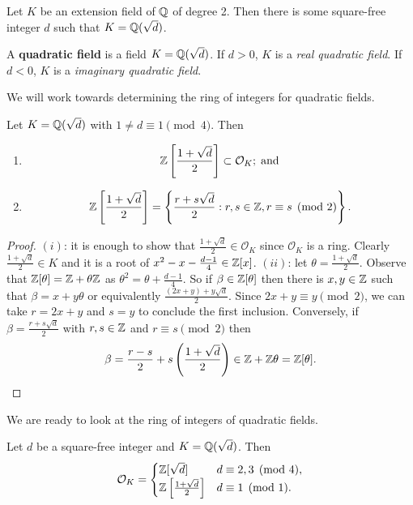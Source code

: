 \begin{proposition}[]
	Let $K$ be an extension field of $\mathbb{Q}$ of degree 2.
	Then there is some square-free integer $d$ such that $K = \mathbb{Q}(\sqrt d)$.
\end{proposition}

\begin{definition}
	A \textbf{quadratic field} is a field $K = \mathbb{Q}(\sqrt d)$.
	If $d > 0$, $K$ is a \emph{real quadratic field}.
	If $d < 0$, $K$ is a \emph{imaginary quadratic field}.
\end{definition}

We will work towards determining the ring of integers for quadratic fields.

\begin{lemma}[]
	Let $K = \mathbb{Q}(\sqrt d)$ with $1 \neq d \equiv 1 \pmod 4$.
	Then
	\begin{enumerate}
		\item
			\[
				\mathbb{Z} \left[ \frac{1+\sqrt d}2 \right] 
				\subset \mathcal O_K;\;\text{and}
			\]

		\item
			\[
				\mathbb{Z} \left[
					\frac{1 + \sqrt d}2
				\right] = \left\{
					\frac{r + s\sqrt d}2:
					r,s \in \mathbb{Z}, r \equiv s \pmod 2
				\right\}.
			\]
	\end{enumerate}
\end{lemma}

\begin{proof}
	$(i)$: it is enough to show that $\frac{1 + \sqrt d}2 \in \mathcal O_K$
	since $\mathcal O_K$ is a ring.
	Clearly $\frac{1 + \sqrt d}2 \in K$ and it is a root of
	$x^2 - x - \frac{d-1}4 \in \mathbb{Z}[x]$.
	$(ii)$: let $\theta = \frac{1 + \sqrt d}2$.
	Observe that $\mathbb{Z}[\theta] = \mathbb{Z} + \theta\mathbb{Z}$ as
	$\theta^2 = \theta + \frac{d-1}4$.
	So if $\beta \in \mathbb{Z}[\theta]$ then there is $x,y \in \mathbb{Z}$ such that
	$\beta = x + y\theta$ or equivalently
	$
		\frac{(2x+y)+y\sqrt d}{2}.
	$
	Since $2x + y \equiv y \pmod 2$, we can take $r = 2x + y$ and
	$s = y$ to conclude the first inclusion.
	Conversely, if $\beta = \frac{r+s\sqrt d}2$ with $r,s \in \mathbb{Z}$ and
	$r \equiv s \pmod 2$ then 
	\[
		\beta = \frac{r-s}2 + s\left( 
			\frac{1 + \sqrt d}{2}  
		\right) \in \mathbb{Z} + \mathbb{Z}\theta = \mathbb{Z}[\theta].\qedhere
	\]
\end{proof}

We are ready to look at the ring of integers of quadratic fields.

\begin{theorem}[]
	Let $d$ be a square-free integer and $K = \mathbb{Q}(\sqrt d)$.
	Then
	\[
		\mathcal O_K =
		\begin{cases}
			\mathbb{Z}[\sqrt d] & d \equiv 2,3 \pmod 4, \\
			\mathbb{Z}\left[\frac{1 + \sqrt d}2\right] & d \equiv 1 \pmod 1. \\
		\end{cases}
	\]
\end{theorem}

